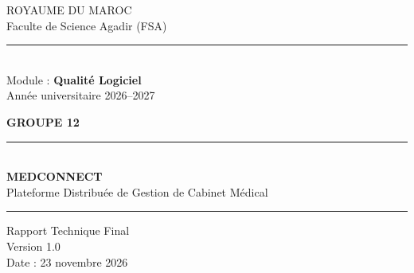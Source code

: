 \documentclass[12pt,a4paper]{report}
\begin{document}

\thispagestyle{empty}
\begin{titlepage}

  \begin{center}
    {\small ROYAUME DU MAROC}\\[0.3em]
    {\small Faculte de Science Agadir (FSA)}\\[0.1em]
    \rule{\linewidth}{0.5pt}\\[0.5em]
    {\small Module : \textbf{Qualité Logiciel}}\\[0.2em]
    {\small Année universitaire 2026--2027}
  \end{center}

  \vspace{1.5cm}

  \begin{center}
    \colorbox{medprimary}{\parbox{0.6\textwidth}{\centering\vspace{0.4em}
      {\color{white}\Large\bfseries GROUPE 12}\\[0.2em]
    \vspace{0.3em}}}
  \end{center}

  \vspace{1cm}

  \begin{center}
    {\color{medprimary}\rule{0.8\linewidth}{1.5pt}}\\[0.5em]
    {\Huge\bfseries\color{medprimary} MEDCONNECT}\\[0.4em]
    {\large\color{medsecondary} Plateforme Distribuée de Gestion de Cabinet Médical}\\[0.3em]
    {\color{medprimary}\rule{0.8\linewidth}{1.5pt}}
  \end{center}

  \vspace{0.8cm}

  \begin{center}
    {\normalsize Rapport Technique Final}\\[0.2em]
    {\normalsize Version 1.0}\\[0.2em]
    {\normalsize Date : 23 novembre 2026}
  \end{center}


\end{titlepage}
\end{document}
